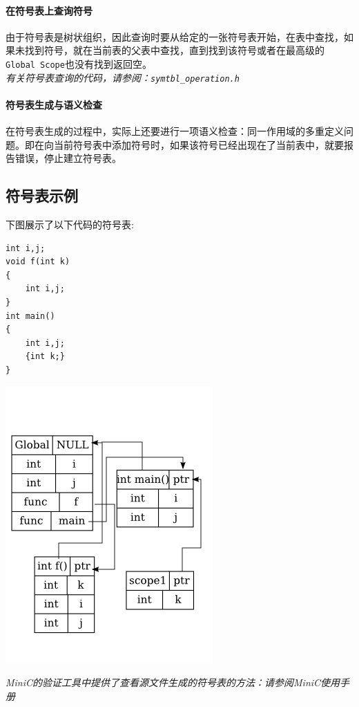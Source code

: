 \paragraph*{在符号表上查询符号}
由于符号表是树状组织，因此查询时要从给定的一张符号表开始，在表中查找，如果未找到符号，就在当前表的父表中查找，直到找到该符号或者在最高级的\verb|Global Scope|也没有找到返回空。
\\
{\it \anchor 有关符号表查询的代码，请参阅：\verb|symtbl_operation.h|}\\
\paragraph*{符号表生成与语义检查}
\label{declchk}
在符号表生成的过程中，实际上还要进行一项语义检查：同一作用域的多重定义问题。即在向当前符号表中添加符号时，如果该符号已经出现在了当前表中，就要报告错误，停止建立符号表。

\subsection{符号表示例}
下图展示了以下代码的符号表:
\begin{lstlisting}
int i,j;
void f(int k)
{
	int i,j;
}
int main()
{
	int i,j;
	{int k;}
}
\end{lstlisting}
\begin{center}
	\includegraphics[scale=0.6]{symtbl.png}
	\label{symtbl}
\end{center}
{\it \manerrarrow MiniC的验证工具中提供了查看源文件生成的符号表的方法：请参阅MiniC使用手册}\\
